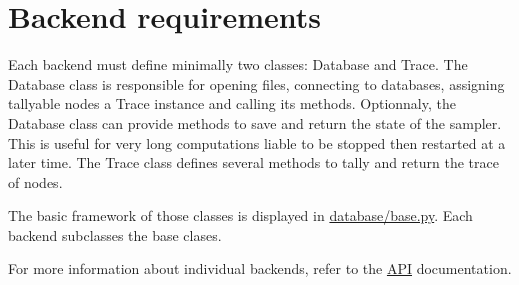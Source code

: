 \hypertarget{backend-requirements}{}
\section*{Backend requirements}
\label{backend-requirements}

Each backend must define minimally two classes: Database and Trace. The Database
class is responsible for opening files, connecting to databases, assigning
tallyable nodes a Trace instance and calling its methods. Optionnaly,
the Database class can provide methods to save and return the state of the
sampler. This is useful for very long computations liable to be stopped then
restarted at a later time.
The Trace class defines several methods to tally and return the trace of nodes.

The basic framework of those classes is displayed in \href{PyMC2/database/base.py}{database/base.py}. Each
backend subclasses the base clases.

For more information about individual backends, refer to the \href{docs/API.pdf}{API} documentation.

\